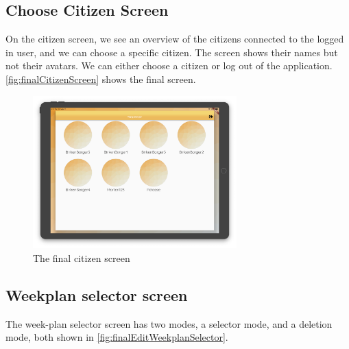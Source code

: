\subsection{Choose Citizen Screen}

On the citizen screen, we see an overview of the \glspl{citizen} connected to the logged in user, and we can choose a specific \gls{citizen}. The screen shows their names but not their avatars. We can either choose a citizen or log out of the application. \autoref{fig:finalCitizenScreen} shows the final screen.

\begin{figure}[H]
    \begin{center}
        \includegraphics[width=0.7\textwidth]{figures/FinalScreen/chooseCitizenScreen.png}
    \end{center}
    \caption{The final \gls{citizen} screen}
    \label{fig:finalCitizenScreen}
\end{figure}

\subsection{Weekplan selector screen}

The week-plan selector screen has two modes, a selector mode, and a deletion mode, both shown in \autoref{fig:finalEditWeekplanSelector}.

